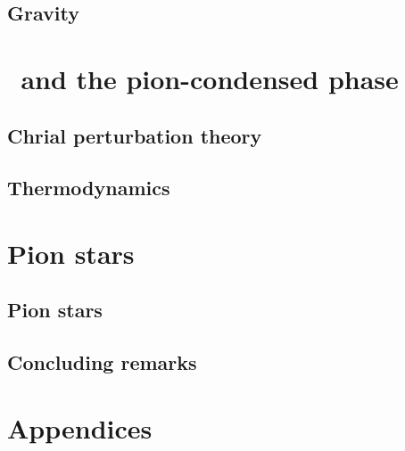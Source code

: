 \documentclass[11pt, a4paper]{book}
\begin{document}
    \chapter{Gravity}
    \label{chapter: GR}
    
    
    

    \part{\chpt\, and the pion-condensed phase}
    \label{part: chpt and the pion-condensed phase}

    \chapter{Chrial perturbation theory}
    \label{chapter: chpt}
    
    
    
    

    \chapter{Thermodynamics}
    \label{chapter: thermodynamics}
    
    
    
    

    \part{Pion stars}
    \label{part: pion stars}

    \chapter{Pion stars}
    \label{chapter: pion stars}
    

    \chapter{Concluding remarks}
    \label{Chapter: cocnlusion and discussion}
    


    \appendix
    \part*{Appendices}
    
\end{document}
